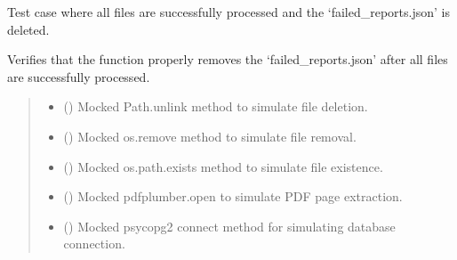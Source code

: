 \documentclass[letterpaper,10pt,english]{sphinxmanual}
\begin{document}
\begin{fulllineitems}
\label{\detokenize{test.data_storage:test.data_storage.test_retry_failed_reports.test_failed_json_removed_after_success}}
\pysigstartsignatures
\pysiglinewithargsret
{}
{\sphinxparamcomma {}\sphinxparamcomma {}\sphinxparamcomma {}\sphinxparamcomma {}\sphinxparamcomma {}\sphinxparamcomma {}\sphinxparamcomma {}}
{}
\pysigstopsignatures
\sphinxAtStartPar
Test case where all files are successfully processed and the ‘failed\_reports.json’ is deleted.

\sphinxAtStartPar
Verifies that the function properly removes the ‘failed\_reports.json’ after all files are successfully processed.
\begin{quote}\begin{description}
\begin{itemize}
\item {} 
\sphinxAtStartPar
{} () \textendash{} Mocked Path.unlink method to simulate file deletion.

\item {} 
\sphinxAtStartPar
{} () \textendash{} Mocked os.remove method to simulate file removal.

\item {} 
\sphinxAtStartPar
{} () \textendash{} Mocked os.path.exists method to simulate file existence.

\item {} 
\sphinxAtStartPar
{} () \textendash{} Mocked pdfplumber.open to simulate PDF page extraction.

\item {} 
\sphinxAtStartPar
{} () \textendash{} Mocked psycopg2 connect method for simulating database connection.


\end{itemize}
\end{description}
\end{quote}
\end{fulllineitems}
\end{document}
